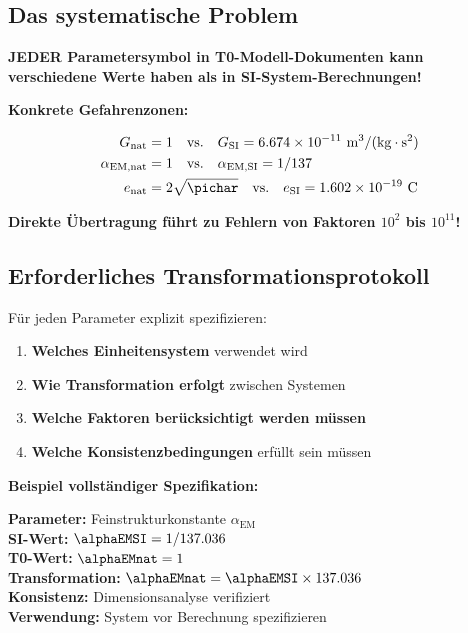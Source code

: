	\subsection{Das systematische Problem}
	\label{subsec:systematisches_problem}
	
	\begin{warning}
		\textbf{JEDER Parametersymbol in T0-Modell-Dokumenten kann verschiedene Werte haben als in SI-System-Berechnungen!}
	\end{warning}
	
	\textbf{Konkrete Gefahrenzonen:}
	
	\begin{align}
		G_{\text{nat}} &= 1 \quad \text{vs.} \quad G_{\text{SI}} = 6.674 \times 10^{-11} \text{ m}^3/(\text{kg} \cdot \text{s}^2) \\
		\alpha_{\text{EM,nat}} &= 1 \quad \text{vs.} \quad \alpha_{\text{EM,SI}} = 1/137 \\
		e_{\text{nat}} &= 2\sqrt{\pichar} \quad \text{vs.} \quad e_{\text{SI}} = 1.602 \times 10^{-19} \text{ C}
	\end{align}
	
	\textbf{Direkte Übertragung führt zu Fehlern von Faktoren $10^2$ bis $10^{11}$!}
	
	\subsection{Erforderliches Transformationsprotokoll}
	\label{subsec:transformationsprotokoll}
	
	Für jeden Parameter explizit spezifizieren:
	
	\begin{enumerate}
		\item \textbf{Welches Einheitensystem} verwendet wird
		\item \textbf{Wie Transformation erfolgt} zwischen Systemen
		\item \textbf{Welche Faktoren berücksichtigt werden müssen}
		\item \textbf{Welche Konsistenzbedingungen} erfüllt sein müssen
	\end{enumerate}
	
	\textbf{Beispiel vollständiger Spezifikation:}
	\begin{tcolorbox}[colback=red!5!white,colframe=red!75!black,title=Parameter-Spezifikationsvorlage]
		\textbf{Parameter:} Feinstrukturkonstante $\alpha_{\text{EM}}$ \\
		\textbf{SI-Wert:} $\alphaEMSI = 1/137.036$ \\
		\textbf{T0-Wert:} $\alphaEMnat = 1$ \\
		\textbf{Transformation:} $\alphaEMnat = \alphaEMSI \times 137.036$ \\
		\textbf{Konsistenz:} Dimensionsanalyse verifiziert \\
		\textbf{Verwendung:} System vor Berechnung spezifizieren
	\end{tcolorbox}
	
